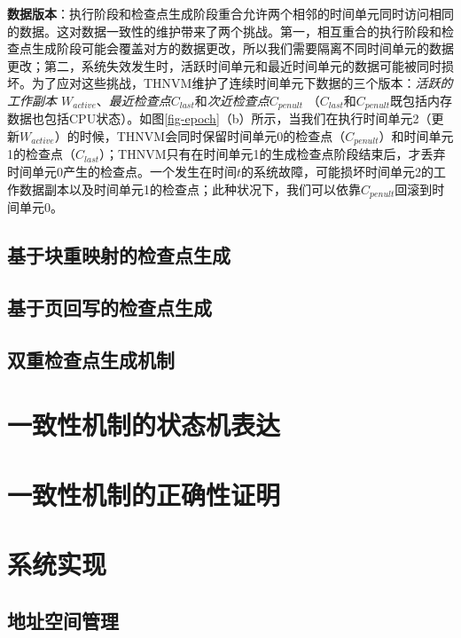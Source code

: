 \textbf{数据版本}：执行阶段和检查点生成阶段重合允许两个相邻的时间单元同时访问相同的数据。这对数据一致性的维护带来了两个挑战。第一，相互重合的执行阶段和检查点生成阶段可能会覆盖对方的数据更改，所以我们需要隔离不同时间单元的数据更改；第二，系统失效发生时，活跃时间单元和最近时间单元的数据可能被同时损坏。为了应对这些挑战，THNVM维护了连续时间单元下数据的三个版本：\emph{活跃的工作副本 $W_{active}$}、\emph{最近检查点$C_{last}$}和\emph{次近检查点$C_{penult}$} （$C_{last}$和$C_{penult}$既包括内存数据也包括CPU状态）。如图\ref{fig-epoch}（b）所示，当我们在执行时间单元2（更新$W_{active}$）的时候，THNVM会同时保留时间单元0的检查点（$C_{penult}$）和时间单元1的检查点（$C_{last}$）；THNVM只有在时间单元1的生成检查点阶段结束后，才丢弃时间单元0产生的检查点。一个发生在时间$t$的系统故障，可能损坏时间单元2的工作数据副本以及时间单元1的检查点；此种状况下，我们可以依靠$C_{penult}$回滚到时间单元0。

\subsection{基于块重映射的检查点生成}
\label{subsec:block-remap}

\subsection{基于页回写的检查点生成}
\label{subsec:page-writeback}

\subsection{双重检查点生成机制}
\label{subsec:coordination}

\section{一致性机制的状态机表达}

\section{一致性机制的正确性证明}

\section{系统实现}

\subsection{地址空间管理}

